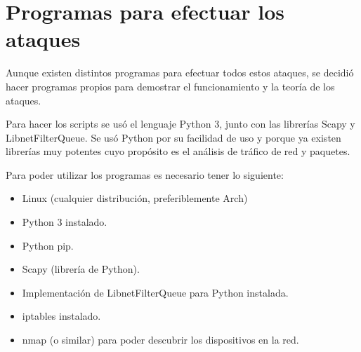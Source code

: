 \documentclass[a4paper, 13pt]{article}
\begin{document}
	\section{Programas para efectuar los ataques}
	\par Aunque existen distintos programas para efectuar todos estos ataques, se decidió hacer programas propios para demostrar el funcionamiento y la teoría de los ataques.
	\par Para hacer los scripts se usó el lenguaje Python 3, junto con las librerías Scapy y LibnetFilterQueue. Se usó Python por su facilidad de uso y porque ya existen librerías muy potentes cuyo propósito es el análisis de tráfico de red y paquetes.
	\par Para poder utilizar los programas es necesario tener lo siguiente:
	\begin{itemize}
		\item Linux (cualquier distribución, preferiblemente Arch)
		\item Python 3 instalado.
		\item Python pip.
		\item Scapy (librería de Python).
		\item Implementación de LibnetFilterQueue para Python instalada.
		\item iptables instalado.
		\item nmap (o similar) para poder descubrir los dispositivos en la red.
	\end{itemize}
	
\end{document}
